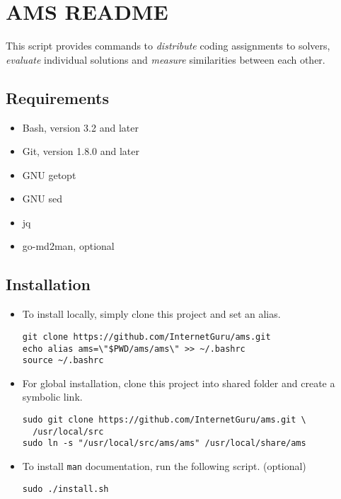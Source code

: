 \chapter{AMS README}\label{apx:ams-readme}

This script provides commands to \emph{distribute} coding assignments to solvers, \emph{evaluate} individual solutions and \emph{measure} similarities between each other.

\section{Requirements}\label{requirements}

\begin{itemize}
\item
  Bash, version 3.2 and later
\item
  Git, version 1.8.0 and later
\item
  GNU getopt
\item
  GNU sed
\item
  jq
\item
  go-md2man, optional
\end{itemize}

\section{Installation}\label{installation}

\begin{itemize}
\item
  To install locally, simply clone this project and set an alias.

\begin{verbatim}
git clone https://github.com/InternetGuru/ams.git
echo alias ams=\"$PWD/ams/ams\" >> ~/.bashrc
source ~/.bashrc
\end{verbatim}

\item
  For global installation, clone this project into shared folder and create a symbolic link.

\begin{verbatim}
sudo git clone https://github.com/InternetGuru/ams.git \
  /usr/local/src
sudo ln -s "/usr/local/src/ams/ams" /usr/local/share/ams
\end{verbatim}

\item
  To install \texttt{man} documentation, run the following script. (optional)

\begin{verbatim}
sudo ./install.sh
\end{verbatim}

\end{itemize}

